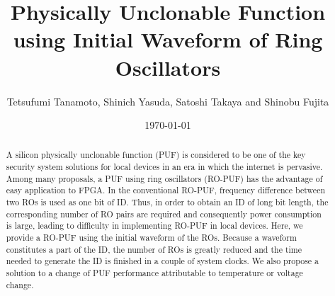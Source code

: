 ﻿\documentclass[aps,preprint,prb,superscriptaddress,amsmath,showpacs,tightenlines]{revtex4}
\begin{document}
\title{Physically Unclonable Function using Initial Waveform of Ring Oscillators}


\author{Tetsufumi Tanamoto, Shinich Yasuda, Satoshi Takaya and Shinobu Fujita}

\date{\today}
\begin{abstract}
A silicon physically unclonable function (PUF) is considered to be one of the key 
security system solutions for local devices in an era in which the internet is pervasive.
Among many proposals, a PUF using ring oscillators (RO-PUF) has the advantage 
of easy application to FPGA. In the conventional RO-PUF,  frequency difference 
between two ROs is used as one bit of ID. 
Thus, in order to obtain an ID of long bit length, the corresponding number of RO pairs 
are required and consequently power consumption is large,  leading to difficulty in
implementing RO-PUF in local devices.
Here, we provide a RO-PUF using the initial waveform of the ROs. 
Because a waveform constitutes a part of the ID, the number of ROs is greatly
reduced and the time needed to generate the ID is finished in a couple of system clocks.
We also propose a solution to a change of PUF performance 
attributable to temperature or voltage change.
\end{abstract}

\maketitle
\end{document}
